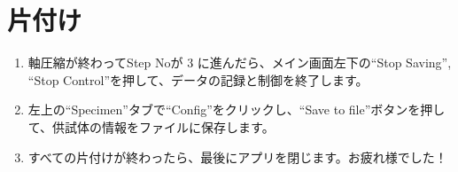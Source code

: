 \section{片付け}
\begin{enumerate}
    \item 軸圧縮が終わってStep Noが 3 に進んだら、メイン画面左下の``Stop Saving'', ``Stop Control''を押して、データの記録と制御を終了します。
    \item 左上の``Specimen''タブで``Config''をクリックし、``Save to file''ボタンを押して、供試体の情報をファイルに保存します。
    \item すべての片付けが終わったら、最後にアプリを閉じます。お疲れ様でした！
\end{enumerate}
